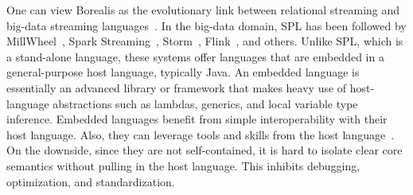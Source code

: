 One can
view Borealis as the evolutionary link between relational streaming
and big-data streaming languages~\cite{abadi_et_al_2005}.
In the big-data domain, SPL has been followed by
MillWheel~\cite{akidau_et_al_2013}, Spark
Streaming~\cite{zaharia_et_al_2013},
Storm~\cite{toshniwal_et_al_2014}, Flink~\cite{carbone_et_al_2015},
and others.  Unlike SPL, which is a stand-alone language, these
systems offer languages that are embedded in a general-purpose host
language, typically Java. An embedded language is essentially an
advanced library or framework that makes heavy use of host-language
abstractions such as lambdas, generics, and local variable type
inference. Embedded languages benefit from simple interoperability
with their host language. Also, they can leverage tools and skills
from the host language~\cite{hudak_1998}. On the downside, since they
are not self-contained, it is hard to isolate clear core semantics
without pulling in the host language. This inhibits debugging,
optimization, and standardization.
